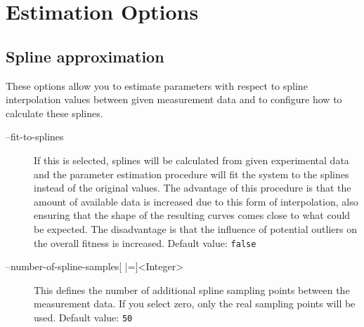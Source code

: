 \section{Estimation Options}
\subsection{Spline approximation}
These options allow you to estimate parameters with respect to spline interpolation values between given measurement data and to configure how to calculate these splines.
\begin{description}
\item[--fit-to-splines]
          If this is selected, splines will be calculated from given experimental
          data and the parameter estimation procedure will fit the system
          to the splines instead of the original values. The advantage
          of this procedure is that the amount of available data is increased
          due to this form of interpolation, also ensuring that the shape
          of the resulting curves comes close to what could be expected.
          The disadvantage is that the influence of potential outliers
          on the overall fitness is increased.
          Default value: \texttt{false}
\item[--number-of-spline-samples{[} |={]}<Integer>]
          This defines the number of additional spline sampling points
          between the measurement data. If you select zero, only the real
          sampling points will be used.
          Default value: \texttt{50}
\end{description}

